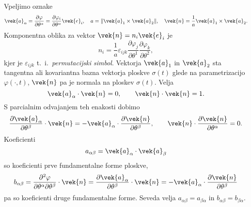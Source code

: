 Vpeljimo oznake
\[
	\vek{a}_{\alpha}=\frac{\partial\varphi}{\partial\theta^{\alpha}}
	=\frac{\partial\varphi_i}{\partial\theta^{\alpha}}\vek{e}_i
	,\quad a=\|\vek{a}_1\times\vek{a}_2\|,\quad
	\vek{n}=\frac{1}{a}\vek{a}_1\times\vek{a}_2.
\]
Komponentna oblika za vektor $\vek{n}=n_i\vek{e}_i$ je
\[
	n_i=\frac{1}{a}\varepsilon_{ijk}\frac{\partial\varphi_j}{\partial\theta^1}
	\frac{\partial\varphi_k}{\partial\theta^2},
\]
kjer je $\varepsilon_{ijk}$
t.~i.~\emph{permutacijski simbol}.
Vektorja $\vek{a}_1$ in $\vek{a}_2$ sta tangentna ali kovariantna bazna vektorja ploskve $\sigma(t)$
glede na parametrizacijo $\varphi(\cdot,t)$,
$\vek{n}$ pa je normala na ploskev $\sigma(t)$. Velja
\begin{equation} \label{e:skalnul}
	\vek{a}_{\alpha}\cdot\vek{n}=0,\qquad \vek{n}\cdot\vek{n}=1.
\end{equation}
S parcialnim odvajanjem teh enakosti dobimo
\[
	\frac{\partial\vek{a}_{\alpha}}{\partial\theta^{\beta}}\cdot\vek{n}=
	-\vek{a}_{\alpha}\cdot\frac{\partial\vek{n}}{\partial\theta^{\beta}},\qquad
	\vek{n}\cdot\frac{\partial\vek{n}}{\partial\theta^{\alpha}}=0.
\]
Koeficienti
\[
	a_{\alpha\beta}=\vek{a}_{\alpha}\cdot\vek{a}_{\beta}
\]
so koeficienti prve fundamentalne forme ploskve,
\begin{equation} \label{e:bkoe}
	b_{\alpha\beta}=\frac{\partial^2\varphi}{\partial\theta^{\alpha}\partial\theta^{\beta}}
	\cdot\vek{n}=\frac{\partial\vek{a}_{\alpha}}{\partial\theta^{\beta}}\cdot\vek{n}
	=-\vek{a}_{\alpha}\cdot\frac{\partial\vek{n}}{\partial\theta^{\beta}}
\end{equation}
pa so koeficienti druge fundamentalne forme. Seveda velja $a_{\alpha\beta}=a_{\beta\alpha}$
in $b_{\alpha\beta}=b_{\beta\alpha}$.

